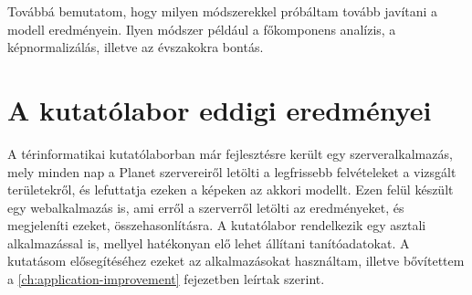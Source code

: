 Továbbá bemutatom, hogy milyen módszerekkel próbáltam tovább javítani a modell eredményein. Ilyen módszer például a főkomponens analízis, a képnormalizálás, illetve az évszakokra bontás.

\section{A kutatólabor eddigi eredményei}

A térinformatikai kutatólaborban már fejlesztésre került egy szerveralkalmazás, mely minden nap a Planet szervereiről letölti a legfrissebb felvételeket a vizsgált területekről, és lefuttatja ezeken a képeken az akkori modellt. Ezen felül készült egy webalkalmazás is, ami erről a szerverről letölti az eredményeket, és megjeleníti ezeket, összehasonlításra. A kutatólabor rendelkezik egy asztali alkalmazással is, mellyel hatékonyan elő lehet állítani tanítóadatokat. A kutatásom elősegítéséhez ezeket az alkalmazásokat használtam, illetve bővítettem a \ref{ch:application-improvement} fejezetben leírtak szerint.